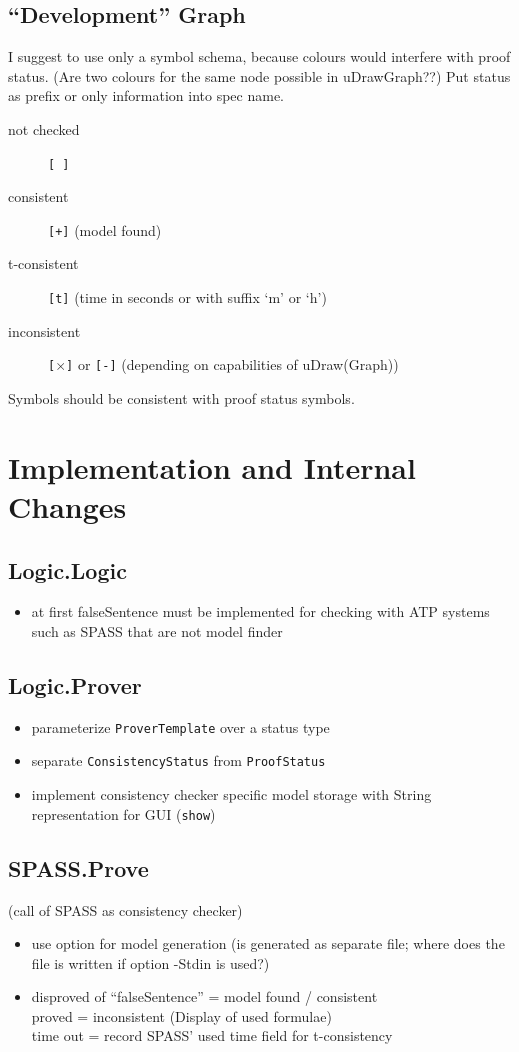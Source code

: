 \documentclass[a4paper,10pt]{article}
\begin{document}
\subsection{``Development'' Graph}
I suggest to use only a symbol schema, because colours would interfere
with proof status. (Are two colours for the same node possible in uDrawGraph??)
Put status as prefix or only information into spec name.
\begin{description}
\item[not checked] \verb,[ ],
\item[consistent] \verb,[+], (model found)
\item[t-consistent] \verb,[t], (time in seconds or with suffix `m' or `h')
\item[inconsistent] \texttt{[$\times$]} or \verb,[-], (depending on
  capabilities of uDraw(Graph))
\end{description}
Symbols should be consistent with proof status symbols.

\section{Implementation and Internal Changes}
\subsection{Logic.Logic}
\begin{itemize}
\item at first falseSentence must be implemented for checking with ATP
  systems such as SPASS that are not model finder  
\end{itemize}
\subsection{Logic.Prover}
\begin{itemize}
\item parameterize \verb,ProverTemplate, over a status type
\item separate \verb,ConsistencyStatus, from \verb,ProofStatus,
\item implement consistency checker specific model storage with String
  representation for GUI (\verb,show,)
\end{itemize}
\subsection{SPASS.Prove}
(call of SPASS as consistency checker)
\begin{itemize}
\item use option for model generation (is generated as separate file;
  where does the file is written if option -Stdin is used?)
\item disproved of ``falseSentence'' = model found / consistent\\
  proved = inconsistent (Display of used formulae)\\
  time out = record SPASS' used time field for t-consistency 

\end{itemize}
\end{document}
